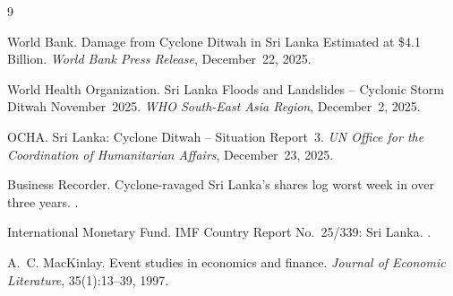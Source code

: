\documentclass[sigconf, nonacm]{acmart}
\begin{document}
\begin{thebibliography}{9}

World Bank.
\newblock Damage from Cyclone Ditwah in Sri Lanka Estimated at \$4.1 Billion.
\newblock \textit{World Bank Press Release}, December~22, 2025.

World Health Organization.
\newblock Sri Lanka Floods and Landslides -- Cyclonic Storm Ditwah
  November~2025.
\newblock \textit{WHO South-East Asia Region}, December~2, 2025.

OCHA.
\newblock Sri Lanka: Cyclone Ditwah -- Situation Report~3.
\newblock \textit{UN Office for the Coordination of Humanitarian Affairs},
  December~23, 2025.

Business Recorder.
\newblock Cyclone-ravaged Sri Lanka's shares log worst week in over three
  years.
.

International Monetary Fund.
\newblock IMF Country Report No.\ 25/339: Sri Lanka.
.

A.~C. MacKinlay.
\newblock Event studies in economics and finance.
\newblock \textit{Journal of Economic Literature}, 35(1):13--39, 1997.

\end{thebibliography}
\end{document}

